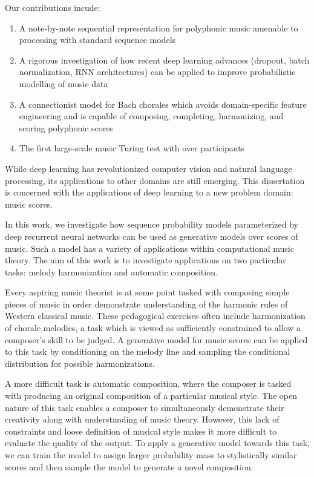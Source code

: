 \documentclass[dissertation.tex]{subfiles}
\begin{document}
Our contributions incude:
\begin{enumerate}
    \item A note-by-note sequential representation for polyphonic music amenable to processing with
        standard sequence models
    \item A rigorous investigation of how recent deep learning advances
      (dropout\cite{srivastava2014dropout}, batch
      normalization\cite{ioffe2015batch}, RNN architectures) can be applied to
      improve probabilistic modelling of music data
    \item A connectionist model for Bach chorales which avoids domain-specific
      feature engineering and is capable of composing, completing, harmonizing,
      and scoring polyphonic scores
    \item The first large-scale music Turing test with over  participants
\end{enumerate}


While deep learning has revolutionized computer vision and natural language
processing, its applications to other domains are still emerging. This
dissertation is concerned with the applications of deep learning to a new
problem domain: music scores.

In this work, we investigate how sequence probability models parameterized by
deep recurrent neural networks can be used as generative models over scores of
music. Such a model has a variety of applications within computational music
theory. The aim of this work is to investigate applications on two particular
tasks: melody harmonization and automatic composition.

Every aspiring music theorist is at some point tasked with composing simple
pieces of music in order demonstrate understanding of the harmonic rules of
Western classical music. These pedagogical exercises often include
harmonization of chorale melodies, a task which is viewed as sufficiently
constrained to allow a composer's skill to be judged. A generative model
for music scores can be applied to this task by conditioning on the melody
line and sampling the conditional distribution for possible harmonizations.

A more difficult task is automatic composition, where the composer is tasked
with producing an original composition of a particular musical style. The open
nature of this task enables a composer to simultaneously demonstrate their
creativity along with understanding of music theory. However, this lack of
constraints and loose definition of musical style makes it more difficult to
evaluate the quality of the output. To apply a generative model towards this
task, we can train the model to assign larger probability mass to stylistically
similar scores and then sample the model to generate a novel composition.
\end{document}
